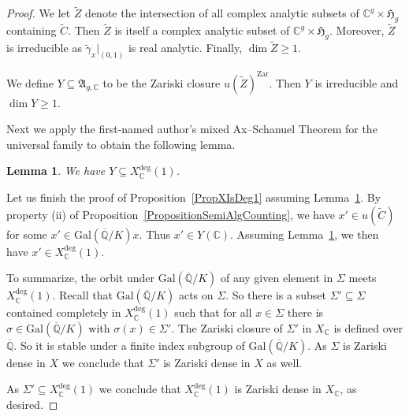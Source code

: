 \documentclass[12pt,oneside]{amsart}
\newcounter{maincounter}
\numberwithin{maincounter}{section}
\numberwithin{equation}{section}
\newtheorem{lemma}[maincounter]{Lemma}
\def\CC{\mathbb{C}}
\def\QQ{\mathbb{Q}}
\newcommand{\IC}{{\CC}}
\newcommand{\IQbar}{{\overline{\QQ}}}
\renewcommand{\subset}{\subseteq} %
\begin{document}
\begin{proof}
  We let $\tilde Z$ denote the intersection of all complex analytic subsets
  of $\IC^g\times \mathfrak{H}_g$ containing $\tilde C$. Then $\tilde Z$ is
  itself a complex analytic subset of $\IC^g\times\mathfrak{H}_g$.
  Moreover, $\tilde Z$ is irreducible as $\tilde\gamma_x|_{(0,1)}$ is real
  analytic. Finally, $\dim \tilde Z\ge 1$.

  We define $Y\subset\mathfrak{A}_{g,\IC}$
  to be the Zariski closure $u(\tilde Z)^{\mathrm{Zar}}$. Then $Y$ is
  irreducible and $\dim Y\ge 1$. 


  Next we apply the first-named author's mixed Ax--Schanuel Theorem for the
  universal family to obtain the following lemma. 
  \begin{lemma}
    \label{LemmaZarClosureinXdeg1}
    We have $Y \subseteq X_\IC^{\mathrm{deg}}(1)$.
  \end{lemma}

  Let us finish the proof of Proposition~\ref{PropXIsDeg1} assuming
  Lemma~\ref{LemmaZarClosureinXdeg1}. By property (ii) of
  Proposition~\ref{PropositionSemiAlgCounting}, we have $x' \in
  u(\tilde{C})$  for some $x' \in \mathrm{Gal}(\IQbar/K)x$. Thus $x' \in
  Y(\IC)$. Assuming Lemma~\ref{LemmaZarClosureinXdeg1}, we then have $x'
  \in X_\IC^{\mathrm{deg}}(1)$.

  To summarize, the orbit under $\mathrm{Gal}(\IQbar/K)$ of any given
  element in $\Sigma$ meets $X_\IC^{\mathrm{deg}}(1)$. Recall that
  $\mathrm{Gal}(\IQbar/K)$ acts on 
  $\Sigma$.
  So there is a subset $\Sigma'\subset \Sigma$ contained
  completely in $X_\IC^{\mathrm{deg}}(1)$ such that for all $x\in \Sigma$
  there is $\sigma\in \mathrm{Gal}(\IQbar/K)$ with $\sigma(x)\in
  \Sigma'$.
  The Zariski closure of $\Sigma'$ in $X_\IC$ is defined over $\IQbar$.
  So it is stable under a finite index subgroup of
  $\mathrm{Gal}(\IQbar/K)$.
  As $\Sigma$ is Zariski dense in $X$ we conclude that $\Sigma'$ is
  Zariski dense in $X$ as well.

  As $\Sigma' \subset X_\IC^{\mathrm{deg}}(1)$ we conclude that
  $X_\IC^{\mathrm{deg}}(1)$ is Zariski dense in $X_\IC$, as desired. 
\end{proof}
\end{document}
